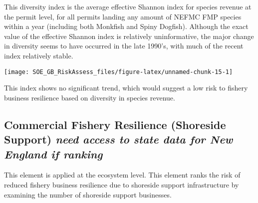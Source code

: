 \documentclass[11pt,]{article}
\let\origfigure\figure
\let\endorigfigure\endfigure
\renewenvironment{figure}[1][2] {
    \expandafter\origfigure\expandafter[H]
} {
    \endorigfigure
}
\begin{document}
This diversity index is the average effective Shannon index for species
revenue at the permit level, for all permits landing any amount of NEFMC
FMP species within a year (including both Monkfish and Spiny Dogfish).
Although the exact value of the effective Shannon index is relatively
uninformative, the major change in diversity seems to have occurred in
the late 1990's, with much of the recent index relatively stable.

\begin{figure}

{\centering \texttt{[image: SOE\_GB\_RiskAssess\_files/figure-latex/unnamed-chunk-15-1]} 

}

\caption{Diversity in species revenue \label{fleetsppdiv}}\label{fig:unnamed-chunk-15}
\end{figure}

This index shows no significant trend, which would suggest a low risk to
fishery business resilience based on diversity in species revenue.

\subsection{\texorpdfstring{Commercial Fishery Resilience (Shoreside
Support) \emph{need access to state data for New England if
ranking}}{Commercial Fishery Resilience (Shoreside Support) need access to state data for New England if ranking}}\label{commercial-fishery-resilience-shoreside-support-need-access-to-state-data-for-new-england-if-ranking}

This element is applied at the ecosystem level. This element ranks the
risk of reduced fishery business resilience due to shoreside support
infrastructure by examining the number of shoreside support businesses.
\end{document}
